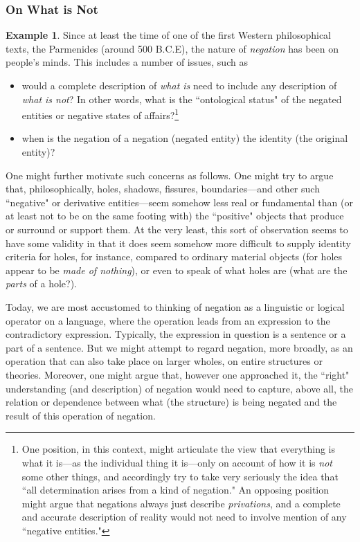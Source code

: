 \documentclass[11pt]{book}
\theoremstyle{definition}
\newtheorem{example}{Example}[section]
\theoremstyle{definition}
\theoremstyle{definition}
\theoremstyle{theorem}
\theoremstyle{definition}
\begin{document}
\subsubsection{On What is Not}
\begin{example}	
Since at least the time of one of the first Western philosophical texts, the Parmenides (around 500 B.C.E), the nature of \textit{negation} has been on people's minds. This includes a number of issues, such as
	\begin{itemize}
		\item  would a complete description of \textit{what is} need to include any description of \textit{what is not}? In other words, what is the ``ontological status" of the negated entities or negative states of affairs?\footnote{One position, in this context, might articulate the view that everything is what it is---as the individual thing it is---only on account of how it is \textit{not} some other things, and accordingly try to take very seriously the idea that ``all determination arises from a kind of negation." An opposing position might argue that negations always just describe \textit{privations}, and a complete and accurate description of reality would not need to involve mention of any ``negative entities."}
		\item when is the negation of a negation (negated entity) the identity (the original entity)? 
	\end{itemize}
	One might further motivate such concerns as follows. One might try to argue that, philosophically, holes, shadows, fissures, boundaries---and other such ``negative" or derivative entities---seem somehow less real or fundamental than (or at least not to be on the same footing with) the ``positive" objects that produce or surround or support them. At the very least, this sort of observation seems to have some validity in that it does seem somehow more difficult to supply identity criteria for holes, for instance, compared to ordinary material objects (for holes appear to be \textit{made of nothing}), or even to speak of what holes are (what are the \textit{parts} of a hole?). \par     
	Today, we are most accustomed to thinking of negation as a linguistic or logical operator on a language, where the operation leads from an expression to the contradictory expression. Typically, the expression in question is a sentence or a part of a sentence. But we might attempt to regard negation, more broadly, as an operation that can also take place on larger wholes, on entire structures or theories. Moreover, one might argue that, however one approached it, the ``right" understanding (and description) of negation would need to capture, above all, the relation or dependence between what (the structure) is being negated and the result of this operation of negation. \par   

\end{example}
\end{document}
